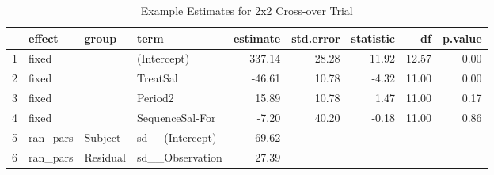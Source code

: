 \begin{table}[ht]
\centering
\begin{tabular}{rlllrrrrr}
  \hline
 & effect & group & term & estimate & std.error & statistic & df & p.value \\ 
  \hline
1 & fixed &  & (Intercept) & 337.14 & 28.28 & 11.92 & 12.57 & 0.00 \\ 
  2 & fixed &  & TreatSal & -46.61 & 10.78 & -4.32 & 11.00 & 0.00 \\ 
  3 & fixed &  & Period2 & 15.89 & 10.78 & 1.47 & 11.00 & 0.17 \\ 
  4 & fixed &  & SequenceSal-For & -7.20 & 40.20 & -0.18 & 11.00 & 0.86 \\ 
  5 & ran\_pars & Subject & sd\_\_(Intercept) & 69.62 &  &  &  &  \\ 
  6 & ran\_pars & Residual & sd\_\_Observation & 27.39 &  &  &  &  \\ 
   \hline
\end{tabular}
\caption{Example Estimates for 2x2 Cross-over Trial} 
\label{modelTable}
\end{table}

